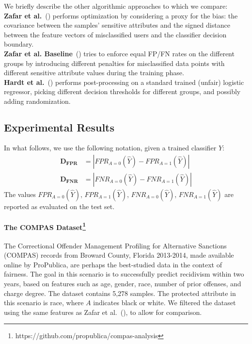 We briefly describe the other algorithmic approaches to which we compare:\\
\textbf{Zafar et al.}~(\citeyear{disparatemistreatment}) performs optimization by considering a proxy for the bias: the covariance between the samples' sensitive attributes and the signed distance between the feature vectors of misclassified users and the classifier decision boundary.\\
\textbf{Zafar et al. Baseline}~(\citeyear{disparatemistreatment}) tries to enforce equal FP/FN rates on the different groups by introducing different penalties for misclassified data points with different sensitive attribute values during the training phase.\\
\textbf{Hardt et al.}~(\citeyear{hardt}) performs post-processing on a standard trained (unfair) logistic regressor, picking different decision thresholds for different groups, and possibly adding randomization.


\subsection{Experimental Results}

In what follows, we use the following notation, given a trained classifier $\hat{Y}$:
\begin{align*}
\mathbf{D_{FPR}}&=\left|FPR_{A=0}(\hat{Y})-FPR_{A=1}(\hat{Y})\right| \\ 
\mathbf{D_{FNR}}&=\left|FNR_{A=0}(\hat{Y})-FNR_{A=1}(\hat{Y})\right|
\end{align*}
The values $FPR_{A=0}(\hat{Y})$, $FPR_{A=1}(\hat{Y})$, $FNR_{A=0}(\hat{Y})$, $FNR_{A=1}(\hat{Y})$ are reported as evaluated on the test set.

\paragraph{The COMPAS Dataset\footnote{https://github.com/propublica/compas-analysis}} The Correctional Offender Management Profiling for Alternative Sanctions (COMPAS) records from Broward County, Florida 2013-2014, made available online by ProPublica, are perhaps the best-studied data in the context of fairness.  The goal in this scenario is to successfully predict recidivism within two years, based on features such as age, gender, race, number of prior offenses, and charge degree. The dataset contains 5,278 samples. The protected attribute in this scenario is race, where $A$ indicates black or white. We filtered the dataset using the same features as Zafar et al.~(\citeyear{disparatemistreatment}), to allow for comparison.

